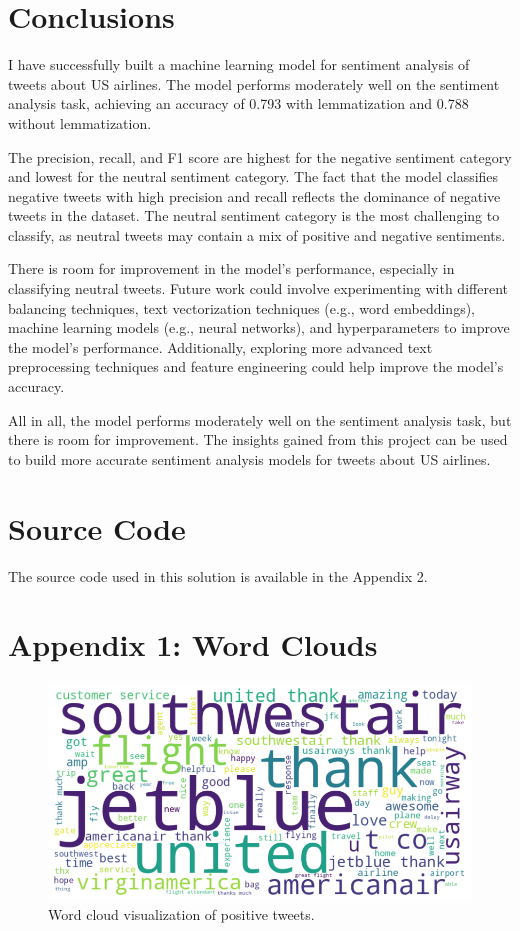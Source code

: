 \documentclass{article}
\begin{document}
\section{Conclusions}

I have successfully built a machine learning model for sentiment analysis of tweets about US airlines. The model performs moderately well on the sentiment analysis task, achieving an accuracy of 0.793 with lemmatization and 0.788 without lemmatization.

The precision, recall, and F1 score are highest for the negative sentiment category and lowest for the neutral sentiment category. The fact that the model classifies negative tweets with high precision and recall reflects the dominance of negative tweets in the dataset. The neutral sentiment category is the most challenging to classify, as neutral tweets may contain a mix of positive and negative sentiments.

There is room for improvement in the model's performance, especially in classifying neutral tweets. Future work could involve experimenting with different balancing techniques, text vectorization techniques (e.g., word embeddings), machine learning models (e.g., neural networks), and hyperparameters to improve the model's performance. Additionally, exploring more advanced text preprocessing techniques and feature engineering could help improve the model's accuracy.

All in all, the model performs moderately well on the sentiment analysis task, but there is room for improvement. The insights gained from this project can be used to build more accurate sentiment analysis models for tweets about US airlines.

\section{Source Code}

The source code used in this solution is available in the Appendix 2.

\newpage

\section*{Appendix 1: Word Clouds}

\begin{figure}[!htbp]
    \centering
    \includegraphics[width=\textwidth]{data/plots/positive_wordcloud.png}
    \caption{Word cloud visualization of positive tweets.}
    \label{fig:positive_wordcloud}
\end{figure}
\end{document}
